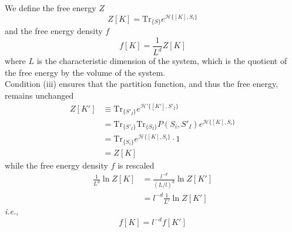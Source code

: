 \documentclass[class=report, float=false, crop=false]{standalone}
\begin{document}


We define the free energy $Z$
\begin{equation}
Z[K]=\text{Tr}_{\{S\}}e^{\mathcal{H}\{[K],S_i\}}
\end{equation}
and the free energy density $f$
\begin{equation}
f[K] = \frac{1}{L^d} Z[K]
\end{equation}
where $L$ is the characteristic dimension of the system, which is the quotient of the free energy by the volume of the system.\\

Condition (iii) ensures that the partition function, and thus the free energy, remains unchanged
\begin{align*}
Z[K'] &\equiv \text{Tr}_{\{S'_I\}}e^{\mathcal{H}'\{[K'],S'_I\}}\\
&= \text{Tr}_{\{S'_I\}}\text{Tr}_{\{S_I\}}P(S_i,S'_I)e^{\mathcal{H}\{[K],S_i\}}\\
&= \text{Tr}_{\{S_i\}}e^{\mathcal{H}\{[K],S_i\}}\cdot1\\
&= Z[K]
\end{align*}
while the free energy density $f$ is rescaled
\begin{align*}
\frac{1}{L^d}\ln Z[K] &= \frac{l^{-d}}{(L/l)^d}\ln Z[K']\\
&= l^{-d} \frac{1}{L'} \ln Z[K']
\end{align*}
\textit{i.e.},
\begin{equation}
f[K] = l^{-d}f[K']
\label{free_energy_scaling}
\end{equation}
\end{document}
